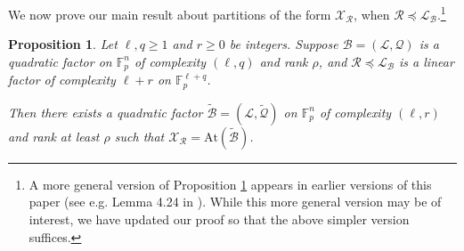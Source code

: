 \documentclass[12pt,oneside,british,a4wide]{amsart}
\newtheorem{proposition}[theorem]{Proposition}
\numberwithin{equation}{section}
\theoremstyle{definition}
\def\F{\mathbb{F}}
\newcommand{\calL}{\mathcal{L}}
\newcommand{\calB}{\mathcal{B}}
\newcommand{\calQ}{\mathcal{Q}}
\newcommand{\calR}{\mathcal{R}}
\newcommand{\calX}{\mathcal{X}}
\newcommand{\At}{{\mathrm{At}}}
\begin{document}
 We now prove our main result about partitions of the form $\calX_{\calR}$, when $\calR\preceq \calL_{\calB}$.\footnote{A more general version of Proposition \ref{prop:pullbackfactor} appears in earlier versions of this paper (see e.g. Lemma 4.24 in \cite{Terry.2021av2}). While this more general version may be of interest, we have updated our proof so that the above  simpler version suffices.  }  


 \begin{proposition}\label{prop:pullbackfactor}
Let $\ell,q\geq 1$ and $r\geq 0$ be integers.  Suppose $\calB=(\calL,\calQ)$ is a quadratic factor on $\F_p^n$ of complexity $(\ell,q)$ and rank $\rho$, and $\calR\preceq\calL_{\calB}$ is a linear factor of complexity $\ell+r$ on $\F_p^{\ell+q}$.  

Then there exists a quadratic factor $\tilde{\calB}=(\calL,\tilde{\calQ})$ on $\F_p^n$ of complexity $(\ell,r)$ and rank at least $\rho$ such that $\calX_{\calR}=\At(\tilde{\calB})$.   
\end{proposition}
\end{document}
